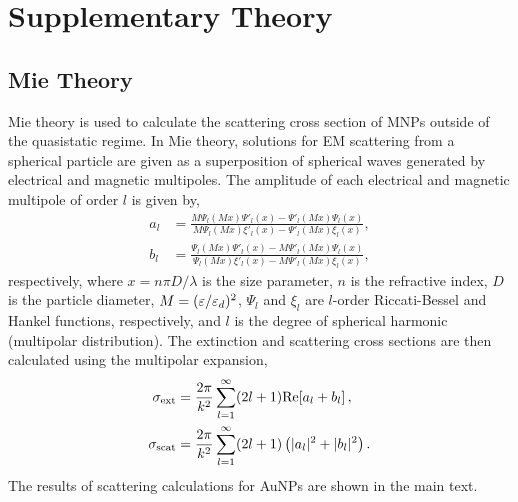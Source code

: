 \documentclass[12pt, a4paper, oneside]{book}
\begin{document}
\chapter{Supplementary Theory}

\section{Mie Theory}

Mie theory \cite{mie1908} is used to calculate the scattering cross section of MNPs outside of the quasistatic regime. In Mie theory, solutions for EM scattering from a spherical particle are given as a superposition of spherical waves generated by electrical and magnetic multipoles. The amplitude of each electrical and magnetic multipole of order $l$ is given by,
\begin{subequations}
\begin{align}
a_l &= \frac{M\Psi_l(Mx)\Psi'_l(x) - \Psi'_l(Mx)\Psi_l(x)}{M\Psi_l(Mx)\xi'_l(x) - \Psi'_l(Mx)\xi_l(x)},\\
b_l &= \frac{\Psi_l(Mx)\Psi'_l(x) - M\Psi'_l(Mx)\Psi_l(x)}{\Psi_l(Mx)\xi'_l(x) - M\Psi'_l(Mx)\xi_l(x)},
\end{align}
\end{subequations}
respectively, where $x=n\pi D/\lambda$ is the size parameter, $n$ is the refractive index, $D$ is the particle diameter, $M=(\varepsilon/\varepsilon_d)^2$, $\Psi_l$ and $\xi_l$ are $l$-order Riccati-Bessel and Hankel functions, respectively, and $l$ is the degree of spherical harmonic (multipolar distribution).
The extinction and scattering cross sections are then calculated using the multipolar expansion,
\begin{subequations}
\begin{align}
\sigma_{\mathrm{ext}} &= \frac{2\pi}{k^2} \sum_{l=1}^\infty (2l+1) \mathrm{Re}\!\left[{a_l+b_l}\right],\\
\sigma_{\mathrm{scat}} &= \frac{2\pi}{k^2} \sum_{l=1}^\infty (2l+1) \left(|a_l|^2+|b_l|^2\right).
\end{align}
\end{subequations}
The results of scattering calculations for AuNPs are shown in the main text.

\end{document}
